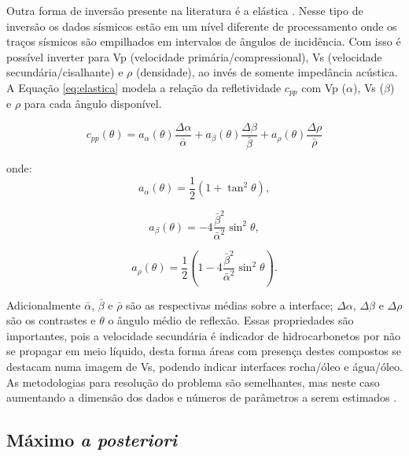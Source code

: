 
Outra forma de inversão presente na literatura é a elástica
\citep{azevedo2013_avoinv,Buland01012003}. Nesse tipo de inversão os dados
sísmicos estão em um nível diferente de processamento onde os traços sísmicos
são empilhados em intervalos de ângulos de incidência. Com isso é possível
inverter para Vp (velocidade primária/compressional), Vs (velocidade
secundária/cisalhante) e $\rho$ (densidade), ao invés de somente impedância
acústica. A Equação \ref{eq:elastica} modela a relação da refletividade $c_{pp}$
com Vp ($\alpha$), Vs ($\beta$) e $\rho$ para cada ângulo disponível.

\begin{equation}
c_{pp}(\theta) = a_\alpha(\theta)\frac{\Delta\alpha}{\bar{\alpha}} +
a_\beta(\theta) \frac{\Delta\beta}{\bar{\beta}} +
a_\rho(\theta) \frac{\Delta\rho}{\bar{\rho}}
\label{eq:elastica}
\end{equation}

onde:
\begin{equation}
a_\alpha(\theta)= \frac{1}{2}(1+\tan^2\theta),
\end{equation}

\begin{equation}
a_\beta(\theta)= -4\frac{\bar{\beta}^2}{\bar{\alpha}^2}\sin^2\theta,
\end{equation}

\begin{equation}
a_\rho(\theta) = \frac{1}{2} \left (  
1-4\frac{\bar{\beta}^2}{\bar{\alpha}^2}\sin^2\theta \right ).
\end{equation}

Adicionalmente $\bar{\alpha}$, $\bar{\beta}$ e $\bar{\rho}$ são as respectivas
médias sobre a interface; $\Delta\alpha$, $\Delta\beta$ e $\Delta\rho$ são os
contrastes e $\theta$ o ângulo médio de reflexão. Essas propriedades são
importantes, pois a velocidade secundária é indicador de hidrocarbonetos por não
se propagar em meio líquido, desta forma áreas com presença destes compostos se
destacam numa imagem de Vs, podendo indicar interfaces rocha/óleo e água/óleo.
As metodologias para resolução do problema são semelhantes, mas neste caso
aumentando a dimensão dos dados e números de parâmetros a serem estimados
\citep{Buland01012003}.

\subsection{Máximo \textit{a posteriori}}
\label{sec:map}

